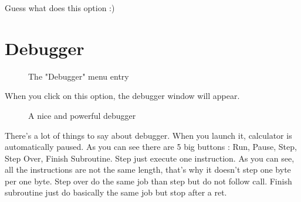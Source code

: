 \documentclass[10pt]{report}
\begin{document}
Guess what does this option :)

\section{Debugger}

\begin{figure}[H]
\centering
{}
\caption{The "Debugger" menu entry}
\end{figure}
When you click on this option, the debugger window will appear.\newline

\begin{figure}[H]
\centering
{}
\caption{A nice and powerful debugger}
\end{figure}
There's a lot of things to say about debugger.\newline
When you launch it, calculator is automatically paused.\newline
As you can see there are 5 big buttons : Run, Pause, Step, Step Over, Finish Subroutine.\newline
Step just execute one instruction.\newline
As you can see, all the instructions are not the same length, that's why it doesn't step one byte per one byte.\newline
Step over do the same job than step but do not follow call.\newline
Finish subroutine just do basically the same job but stop after a ret.\newline
\end{document}
